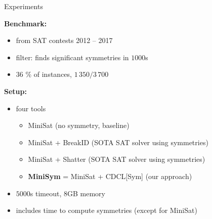 \documentclass{beamer}
\begin{document}
\begin{frame}{Experiments}

\textbf{Benchmark:}
\begin{itemize}
	\item from SAT contests 2012 -- 2017
	\item filter: \bliss{} finds significant symmetries in $1000$s
	\item 36 \% of instances, $1\,350 / 3\,700$
\end{itemize}

\textbf{Setup:}
\begin{itemize}
	\item four tools
	\begin{itemize}
		\item MiniSat (no symmetry, baseline)
		\item MiniSat + BreakID (SOTA SAT solver using symmetries)
		\item MiniSat + Shatter (SOTA SAT solver using symmetries)
		\item \textbf{MiniSym} = MiniSat + CDCL[Sym] (our approach)
	\end{itemize}
	\item $5000$s timeout, $8$GB memory
	\item includes time to compute symmetries (except for MiniSat)
\end{itemize}

\end{frame}
\end{document}

